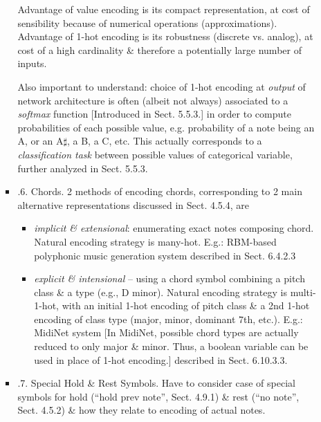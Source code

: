 \documentclass{article}
\begin{document}
\begin{itemize}
\begin{itemize}
\begin{itemize}
			Advantage of value encoding is its compact representation, at cost of sensibility because of numerical operations (approximations). Advantage of 1-hot encoding is its robustness (discrete vs. analog), at cost of a high cardinality \& therefore a potentially large number of inputs.
			
			Also important to understand: choice of 1-hot encoding at {\it output} of network architecture is often (albeit not always) associated to a {\it softmax} function [Introduced in Sect. 5.5.3.] in order to compute probabilities of each possible value, e.g. probability of a note being an A, or an A$\sharp$, a B, a C, etc. This actually corresponds to a {\it classification task} between possible values of categorical variable, further analyzed in Sect. 5.5.3.
			\item {.6. Chords.} 2 methods of encoding chords, corresponding to 2 main alternative representations discussed in Sect. 4.5.4, are
			\begin{itemize}
				\item {\it implicit \& extensional}: enumerating exact notes composing chord. Natural encoding strategy is many-hot. E.g.: RBM-based polyphonic music generation system described in Sect. 6.4.2.3
				\item {\it explicit \& intensional} -- using a chord symbol combining a pitch class \& a type (e.g., D minor). Natural encoding strategy is multi-1-hot, with an initial 1-hot encoding of pitch class \& a 2nd 1-hot encoding of class type (major, minor, dominant 7th, etc.). E.g.: MidiNet system [In MidiNet, possible chord types are actually reduced to only major \& minor. Thus, a boolean variable can be used in place of 1-hot encoding.] described in Sect. 6.10.3.3.
			\end{itemize}
			\item {.7. Special Hold \& Rest Symbols.} Have to consider case of special symbols for hold (``hold prev note'', Sect. 4.9.1) \& rest (``no note'', Sect. 4.5.2) \& how they relate to encoding of actual notes.
			

\end{itemize}
\end{itemize}
\end{itemize}
\end{document}
